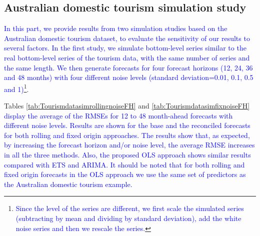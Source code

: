 \documentclass[11pt,a4paper,]{article}
\begin{document}
\hypertarget{australian-domestic-tourism-simulation-study}{%
\subsection{Australian domestic tourism simulation study}\label{australian-domestic-tourism-simulation-study}}

\textcolor{blue}{In this part, we provide results from two simulation studies based on the Australian domestic tourism dataset, to evaluate the sensitivity of our results to several factors. In the first study, we simulate bottom-level series similar to the real bottom-level series of the tourism data, with the same number of series and the same length. We then generate forecasts for four forecast horizons (12, 24, 36 and 48 months) with four different noise levels (standard deviation=0.01, 0.1, 0.5 and 1)}\footnote{\textcolor{blue}{Since the level of the series are different, we first scale the simulated series (subtracting by mean and dividing by standard deviation), add the white noise series and then we rescale the series.}}.

Tables \ref{tab:TourismdatasimrollingnoiseFH} and \ref{tab:TourismdatasimfixnoiseFH} \textcolor{blue}{display the average of the RMSEs for 12 to 48 month-ahead forecasts with different noise levels. Results are shown for the base and the reconciled forecasts for both rolling and fixed origin approaches. The results show that, as expected, by increasing the forecast horizon and/or noise level, the average RMSE increases in all the three methods. Also, the proposed OLS approach shows similar results compared with ETS and ARIMA. It should be noted that for both rolling and fixed origin forecasts in the OLS approach we use the same set of predictors as the Australian domestic tourism example.}
\end{document}
